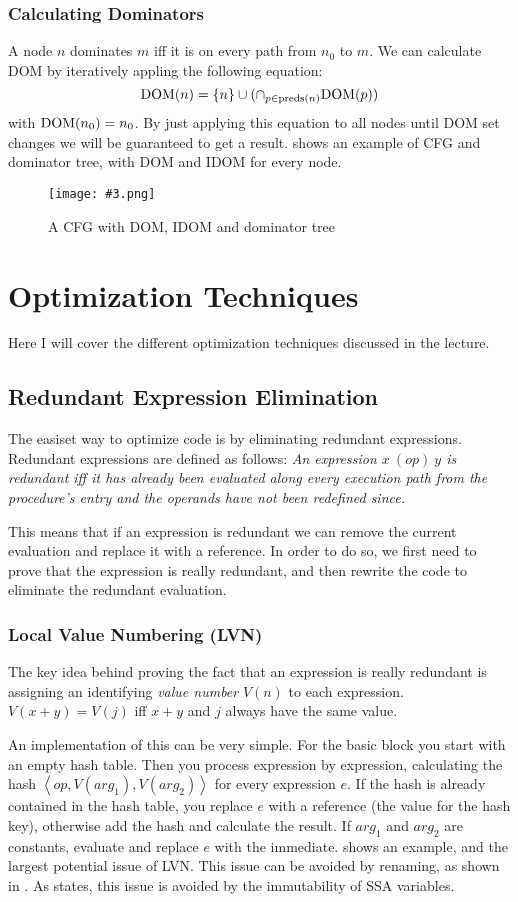 \documentclass{article}
\newcommand{\fig}[4]{
	\begin{figure}[#1]
		\center
		\texttt{[image: \#3.png]}
		\caption{#4}
		\label{fig:#3}
	\end{figure}
	}
\begin{document}
\subsubsection{Calculating Dominators}
A node $n$ dominates $m$ iff it is on every path from $n_0$ to $m$.
We can calculate DOM by iteratively appling the following equation:
\begin{equation}
	\textup{DOM}(n) = \{n\} \cup (\cap_{p \in \textup{preds}(n)} \textup{DOM}(p))
\end{equation}
with $\textup{DOM}(n_0) = {n_0}$.
By just applying this equation to all nodes until DOM set changes we will be guaranteed to get a result.
 shows an example of CFG and dominator tree, with DOM and IDOM for every node.

\fig{h}{0.8}{domtree}{A CFG with DOM, IDOM and dominator tree}

\section{Optimization Techniques}
Here I will cover the different optimization techniques discussed in the lecture.

\subsection{Redundant Expression Elimination}
The easiset way to optimize code is by eliminating redundant expressions.
Redundant expressions are defined as follows:
\emph{An expression $x\ (op)\ y$ is redundant iff it has already been evaluated along every execution path from the procedure's entry and the operands have not been redefined since.}

This means that if an expression is redundant we can remove the current evaluation and replace it with a reference.
In order to do so, we first need to prove that the expression is really redundant, and then rewrite the code to eliminate the redundant evaluation.

\subsubsection{Local Value Numbering (LVN)}
The key idea behind proving the fact that an expression is really redundant is assigning an identifying \emph{value number} $V(n)$ to each expression.
$V(x+y) = V(j)$ iff $x+y$ and $j$ always have the same value.

An implementation of this can be very simple.
For the basic block you start with an empty hash table.
Then you process expression by expression, calculating the hash $\left<op,V(arg_1),V(arg_2)\right>$ for every expression $e$.
If the hash is already contained in the hash table, you replace $e$ with a reference (the value for the hash key), otherwise add the hash and calculate the result.
If $arg_1$ and $arg_2$ are constants, evaluate and replace $e$ with the immediate.
 shows an example, and the largest potential issue of LVN.
This issue can be avoided by renaming, as shown in .
As  states, this issue is avoided by the immutability of SSA variables.
\end{document}
